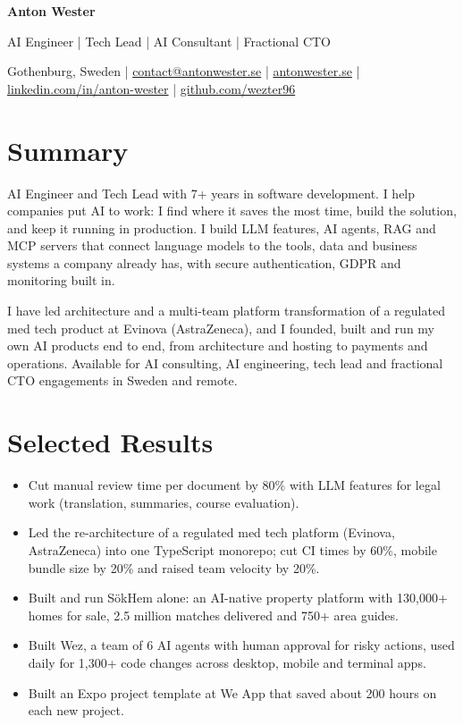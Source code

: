 \documentclass[a4paper,11pt]{article}
\newenvironment{points}{\begin{itemize}[leftmargin=0.18in, itemsep=1pt, topsep=2pt, parsep=0pt]\small}{\end{itemize}}
\begin{document}
\begin{center}
  {\Huge\bfseries\color{accent} Anton Wester}\par\vspace{3pt}
  {\large AI Engineer | Tech Lead | AI Consultant | Fractional CTO}\par\vspace{3pt}
  \small Gothenburg, Sweden  |  \href{mailto:contact@antonwester.se}{contact@antonwester.se}  |  \href{https://antonwester.se}{antonwester.se}  |  \href{https://www.linkedin.com/in/anton-wester/}{linkedin.com/in/anton-wester}  |  \href{https://github.com/wezter96}{github.com/wezter96}
\end{center}

\section{Summary}
\small
AI Engineer and Tech Lead with 7+ years in software development. I help companies put AI to work: I find where it saves the most time, build the solution, and keep it running in production. I build LLM features, AI agents, RAG and MCP servers that connect language models to the tools, data and business systems a company already has, with secure authentication, GDPR and monitoring built in.

I have led architecture and a multi-team platform transformation of a regulated med tech product at Evinova (AstraZeneca), and I founded, built and run my own AI products end to end, from architecture and hosting to payments and operations. Available for AI consulting, AI engineering, tech lead and fractional CTO engagements in Sweden and remote.

\section{Selected Results}
\begin{points}
  \item Cut manual review time per document by 80\% with LLM features for legal work (translation, summaries, course evaluation).
  \item Led the re-architecture of a regulated med tech platform (Evinova, AstraZeneca) into one TypeScript monorepo; cut CI times by 60\%, mobile bundle size by 20\% and raised team velocity by 20\%.
  \item Built and run SökHem alone: an AI-native property platform with 130,000+ homes for sale, 2.5 million matches delivered and 750+ area guides.
  \item Built Wez, a team of 6 AI agents with human approval for risky actions, used daily for 1,300+ code changes across desktop, mobile and terminal apps.
  \item Built an Expo project template at We App that saved about 200 hours on each new project.
\end{points}
\end{document}
